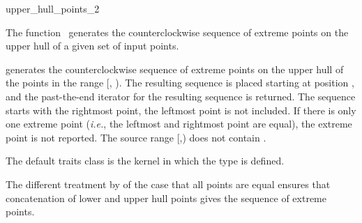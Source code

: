 

\begin{ccRefFunction}{upper_hull_points_2}  %

\ccDefinition
  
The function \ccRefName\ generates the counterclockwise sequence of extreme
points on the upper hull of a given set of input points.


           {generates the counterclockwise sequence of extreme points
            on the upper hull of the points in the range [,
            ). The resulting sequence is placed starting at
            position , and the past-the-end iterator for
            the resulting sequence is returned.
            The sequence starts with the rightmost point,
            the leftmost point is not included.
            If there is only one extreme point ({\it i.e.}, the leftmost and
            rightmost point are equal), the extreme point is not reported.
            \ccPrecond%
            The source range [,) does not contain
            .}


The default traits class  is the kernel in which the
type  is defined.

The different treatment by  of the case that 
all points are equal ensures that concatenation of lower and upper hull 
points gives the sequence of extreme points.


\end{ccRefFunction}
